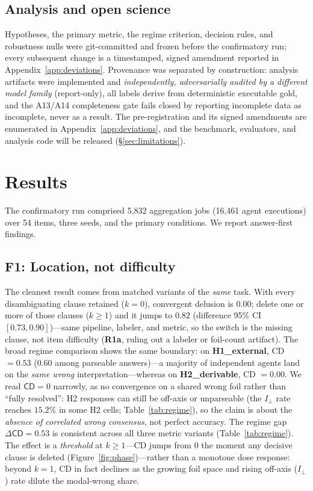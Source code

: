 \documentclass[acmsmall,screen,review,anonymous]{acmart}
\newcommand{\cd}{\textsf{CD}}
\newcommand{\iperp}{\ensuremath{I_\perp}}
\begin{document}
\subsection{Analysis and open science}
Hypotheses, the primary metric, the regime criterion, decision rules, and robustness nulls were
git-committed and frozen before the confirmatory run; every subsequent change is a timestamped, signed
amendment reported in Appendix~\ref{app:deviations}. Provenance was separated by construction: analysis
artifacts were implemented and \emph{independently, adversarially audited by a different model family}
(report-only), all labels derive from deterministic executable gold,
and the A13/A14 completeness gate fails closed by reporting incomplete data as incomplete, never as a result.
The pre-registration and its signed amendments are
enumerated in Appendix~\ref{app:deviations}, and the benchmark, evaluators, and analysis code will be
released (\S\ref{sec:limitations}).

\section{Results}
\label{sec:results}
The confirmatory run comprised 5{,}832 aggregation jobs (16{,}461 agent executions) over 54 items, three
seeds, and the primary conditions. We report answer-first findings.

\subsection{F1: Location, not difficulty}
The cleanest result comes from matched variants of the \emph{same} task. With every disambiguating clause
retained ($k{=}0$), convergent delusion is $0.00$; delete one or more of those clauses ($k{\ge}1$) and it
jumps to $0.82$ (difference 95\% CI $[0.73,0.90]$)---same pipeline, labeler, and metric, so the switch is the
missing clause, not item difficulty (\textbf{R1a}, ruling out a labeler or foil-count artifact). The broad
regime comparison shows the same boundary: on \textbf{H1\_external}, \cd{} $=0.53$ (0.60 among parseable
answers)---a majority of independent agents land on the \emph{same wrong} interpretation---whereas on
\textbf{H2\_derivable}, \cd{} $=0.00$. We read $\cd=0$ narrowly, as no convergence on a shared wrong foil
rather than ``fully resolved'': H2 responses can still be off-axis or unparseable (the \iperp{} rate reaches
$15.2\%$ in some H2 cells; Table~\ref{tab:regime}), so the claim is about the \emph{absence of correlated
wrong consensus}, not perfect accuracy. The regime gap $\Delta\cd=0.53$ is consistent across all three metric
variants (Table~\ref{tab:regime}). The effect is a \emph{threshold} at $k{\ge}1$---\cd{} jumps from $0$ the
moment any decisive clause is deleted (Figure~\ref{fig:phase})---rather than a monotone dose response:
beyond $k{=}1$, \cd{} in fact declines as the growing foil space and rising off-axis (\iperp{}) rate dilute
the modal-wrong share.
\end{document}
